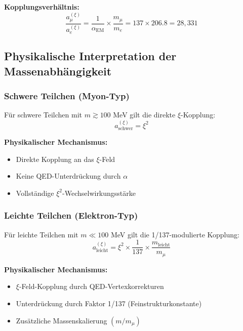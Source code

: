 \documentclass[12pt,a4paper]{article}
\newcommand{\xipar}{\xi}
\newcommand{\alphaEM}{\alpha_{\text{EM}}}
\begin{document}
	\begin{formel}
		\textbf{Kopplungsverhältnis:}
		\begin{equation}
			\frac{a_\mu^{(\xipar)}}{a_e^{(\xipar)}} = \frac{1}{\alphaEM} \times \frac{m_\mu}{m_e} = 137 \times 206.8 = 28{,}331
		\end{equation}
	\end{formel}
	
	\subsection{Physikalische Interpretation der Massenabhängigkeit}
	
	\subsubsection{Schwere Teilchen (Myon-Typ)}
	
	Für schwere Teilchen mit $m \gtrsim 100$ MeV gilt die direkte $\xipar$-Kopplung:
	\begin{equation}
		a_{\text{schwer}}^{(\xipar)} = \xipar^2
	\end{equation}
	
	\textbf{Physikalischer Mechanismus:}
	\begin{itemize}
		\item Direkte Kopplung an das $\xipar$-Feld
		\item Keine QED-Unterdrückung durch $\alpha$
		\item Vollständige $\xipar^2$-Wechselwirkungsstärke
	\end{itemize}
	
	\subsubsection{Leichte Teilchen (Elektron-Typ)}
	
	Für leichte Teilchen mit $m \ll 100$ MeV gilt die 1/137-modulierte Kopplung:
	\begin{equation}
		a_{\text{leicht}}^{(\xipar)} = \xipar^2 \times \frac{1}{137} \times \frac{m_{\text{leicht}}}{m_\mu}
	\end{equation}
	
	\textbf{Physikalischer Mechanismus:}
	\begin{itemize}
		\item $\xipar$-Feld-Kopplung durch QED-Vertexkorrekturen
		\item Unterdrückung durch Faktor 1/137 (Feinstrukturkonstante)
		\item Zusätzliche Massenskalierung $(m/m_\mu)$
	\end{itemize}
	
\end{document}
